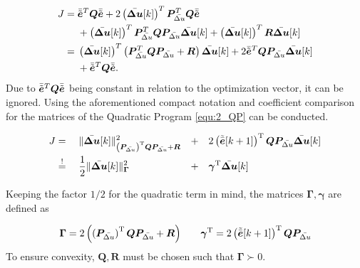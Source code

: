 \begin{align*}
	J
	={}&
	\Bar{\Tilde{\bm{e}}}^{T}
	\bm{Q}
	\Bar{\Tilde{\bm{e}}}
	+
	2\left(\Bar{\bm{\Delta u}}[k]\right)^T
	\bm{P}_{\Bar{\Delta u}}^T
	\bm{Q}
	\Bar{\Tilde{\bm{e}}}
	\\
	&+
	\left(\Bar{\bm{\Delta u}}[k]\right)^T
	\bm{P}_{\Bar{\Delta u}}^T
	\bm{Q}
	\bm{P}_{\Bar{\Delta u}}
	\Bar{\bm{\Delta u}}[k]
	+
	\left(\Bar{\bm{\Delta u}}[k]\right)^T
	\boldsymbol{R}
	\Bar{\bm{\Delta u}}[k]
	\\
	={}&
	\left(\Bar{\bm{\Delta u}}[k]\right)^T
	\left(
	\bm{P}_{\Bar{\Delta u}}^T
	\bm{Q}
	\bm{P}_{\Bar{\Delta u}}
	+
	\boldsymbol{R}
	\right)
	\Bar{\bm{\Delta u}}[k]
	+
	2
	\Bar{\Tilde{\bm{e}}}^{T}
	\bm{Q}
	\bm{P}_{\Bar{\Delta u}}
	\Bar{\bm{\Delta u}}[k]
	\\
	&+
	\Bar{\Tilde{\bm{e}}}^{T}
	\bm{Q}
	\Bar{\Tilde{\bm{e}}}.
\end{align*}
Due to $	\Bar{\Tilde{\bm{e}}}^{T}\bm{Q} \Bar{\Tilde{\bm{e}}}$ being constant in relation to the optimization vector, it can be ignored. Using the aforementioned compact notation and coefficient comparison for the matrices of the Quadratic Program \eqref{equ:2_QP} can be conducted.

\begin{align*}
	J &=  \quad \| {\Bar{\bm{\Delta u}}[k]} \|_{\left( \bm{P}_{\Bar{\Delta u}} \right)^{\mathrm{T}}  \bm{Q} \bm{P}_{\Bar{\Delta u}} + \bm{R}}^2 &+\quad& 2 \left(\Tilde{\Bar{\bm{e}}}[k+1]\right)^{\mathrm{T}} \bm{Q} \bm{P}_{\Bar{\Delta u}} \Bar{\bm{\Delta u}}[k] \\
	 &\overset{!}{=} \quad \frac{1}{2} \| {\Bar{\bm{\Delta u}}[k]} \|_{\bm{\Gamma}}^2  &+\quad&  \bm{\gamma}^{\mathrm{T}} \Bar{\bm{\Delta u}}[k] \\
\end{align*}

Keeping the factor $1/2$ for the quadratic term in mind, the matrices $\bm \Gamma, \bm \gamma$ are defined as

\begin{align*}
	  \bm{\Gamma} = 2  \left(\left( \bm{P}_{\Bar{\Delta u}} \right)^{\mathrm{T}}  \bm{Q} \bm{P}_{\Bar{\Delta u}}  + \bm{R} \right) & \quad & \bm{\gamma}^{\mathrm{T}}  = 2 \left(\Tilde{\Bar{\bm{e}}}[k+1]\right)^{\mathrm{T}} \bm{Q} \bm{P}_{\Bar{\Delta u}}
\end{align*}
To ensure convexity,  $\bm{Q}, \bm{R}$ must be chosen such that $\bm{\Gamma}  \succ 0$.

